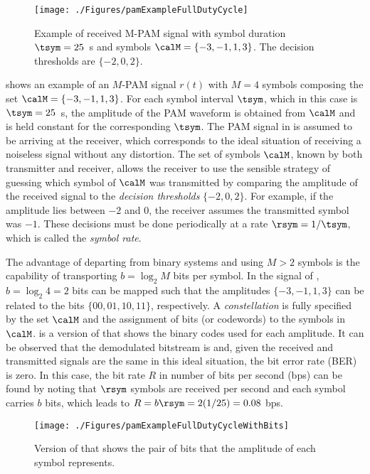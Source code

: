\begin{figure}[htbp]
\centering
\texttt{[image: ./Figures/pamExampleFullDutyCycle]}
\caption{Example of received M-PAM signal with symbol duration $\tsym=25$~s and symbols $\calM=\{-3,-1,1,3\}$. The decision thresholds are $\{-2,0,2\}$.\label{fig:pamExampleFullDutyCycle}}
\end{figure}

 shows an example of an $M$-PAM signal $r(t)$ with $M=4$ symbols composing the set $\calM=\{-3,-1,1,3\}$. For each symbol interval $\tsym$, which in this case is $\tsym=25$~s, the amplitude of the PAM waveform is obtained from $\calM$ and is held constant for the corresponding $\tsym$. The PAM signal in  is assumed to be arriving at the receiver, which corresponds to the ideal situation of receiving a noiseless signal without any distortion. The set of symbols $\calM$, known by both transmitter and receiver, allows the receiver to use the sensible strategy of guessing which symbol of $\calM$ was transmitted by comparing the amplitude of the received signal to the \emph{decision thresholds} $\{-2,0,2\}$. For example, if the amplitude lies between $-2$ and 0, the receiver assumes the transmitted symbol was $-1$. These decisions must be done periodically at a rate $\rsym=1/\tsym$, which is called the \emph{symbol rate}.

The advantage of departing from binary systems and using $M>2$ symbols is the capability of transporting $b=\log_2 M$ bits per symbol. In the signal of , $b=\log_2 4 = 2$ bits can be mapped such that the amplitudes $\{-3,-1,1,3\}$ can be related to the bits $\{00,01,10,11\}$, respectively. A \emph{constellation} is fully specified by the set $\calM$ and the assignment of bits (or codewords) to the symbols in $\calM$.  is a version of  that shows the binary codes used for each amplitude. It can be observed that 
the demodulated bitstream is  and, given the received and transmitted signals are the same in this ideal situation, the bit error rate (BER) is zero. In this case, the bit rate $R$ in number of bits per second (bps) can be found by noting that $\rsym$ symbols are received per second and each symbol carries $b$ bits, which leads to $R = b \rsym = 2(1/25) = 0.08$ bps.

\begin{figure}[htbp]
\centering
\texttt{[image: ./Figures/pamExampleFullDutyCycleWithBits]}
\caption{Version of  that shows the pair of bits that the amplitude of each symbol represents.\label{fig:pamExampleFullDutyCycleWithBits}}
\end{figure}

